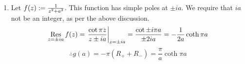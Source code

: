 \begin{enumerate}[wide, labelindent = 0pt, label = (\alph*)]
\item
Let $f(z) := \frac{1}{z^2 + a^2}$. This function has simple poles at $\pm ia$.
We require that $ia$ not be an integer, as per the above discussion.
\[
    \mathop{\mathrm{Res}}_{z = \pm ia}{f(z)}
    = {\left. \frac{\cot \pi z}{z \pm ia} \right|}_{z = \pm ia}
    = \frac{\cot \pm i\pi a}{\pm 2ia}
    = -\frac{1}{2a} \coth \pi a
\]
\[
    \therefore g(a)
    = -\pi \left( R_+ + R_- \right)
    = \frac{\pi}{a} \coth \pi a
\]

\end{enumerate}